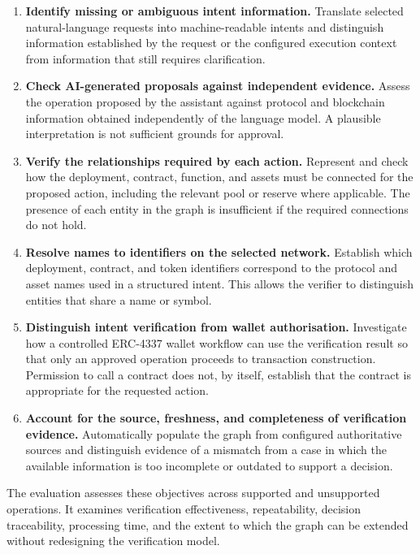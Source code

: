 \begin{enumerate}
    \item \textbf{Identify missing or ambiguous intent information.}
    Translate selected natural-language requests into machine-readable
    intents and distinguish information established by the request or
    the configured execution context from information that still
    requires clarification.

    \item \textbf{Check AI-generated proposals against independent
    evidence.}
    Assess the operation proposed by the assistant against protocol
    and blockchain information obtained independently of the language
    model. A plausible interpretation is not sufficient grounds for
    approval.

    \item \textbf{Verify the relationships required by each action.}
    Represent and check how the deployment, contract, function, and
    assets must be connected for the proposed action, including the
    relevant pool or reserve where applicable. The presence of each
    entity in the graph is insufficient if the required connections
    do not hold.

    \item \textbf{Resolve names to identifiers on the selected network.}
    Establish which deployment, contract, and token identifiers
    correspond to the protocol and asset names used in a structured
    intent. This allows the verifier to distinguish entities that
    share a name or symbol.

    \item \textbf{Distinguish intent verification from wallet
    authorisation.}
    Investigate how a controlled ERC-4337 wallet workflow can use the
    verification result so that only an approved operation proceeds
    to transaction construction. Permission to call a contract does
    not, by itself, establish that the contract is appropriate for
    the requested action.

    \item \textbf{Account for the source, freshness, and completeness
    of verification evidence.}
    Automatically populate the graph from configured authoritative
    sources and distinguish evidence of a mismatch from a case in
    which the available information is too incomplete or outdated
    to support a decision.
\end{enumerate}

The evaluation assesses these objectives across supported and
unsupported operations. It examines verification effectiveness,
repeatability, decision traceability, processing time, and the extent
to which the graph can be extended without redesigning the
verification model.

